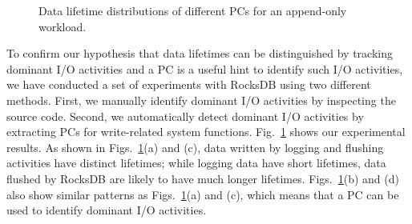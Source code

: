 \begin{figure}[t]
\centering
\hfill
	\hspace{2pt}
\hfill
\vspace{7pt}
	\hspace{2pt}
\caption{Data lifetime distributions of different PCs for an append-only workload.} 
\label{fig:types_and_PCs}
\end{figure}

To confirm our hypothesis that data lifetimes can be distinguished by tracking
dominant I/O activities and a PC is a useful hint to identify such I/O
activities, we have conducted a set of experiments with RocksDB using two
different methods.  First, we manually identify dominant I/O activities by
inspecting the source code.  Second, we automatically detect dominant I/O
activities by extracting PCs for write-related system functions.
Fig.~\ref{fig:types_and_PCs} shows our experimental results.  As shown in
Figs.~\ref{fig:types_and_PCs}(a) and (c), data written by logging and flushing
activities have distinct lifetimes; while logging data have short lifetimes,
data flushed by RocksDB are likely to have much longer lifetimes.
Figs.~\ref{fig:types_and_PCs}(b) and (d) also show similar patterns as
Figs.~\ref{fig:types_and_PCs}(a) and (c), which means that a PC can be used to
identify dominant I/O activities.

